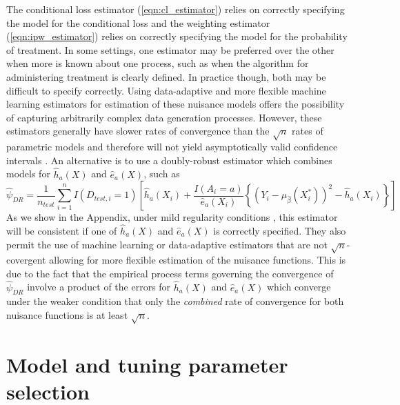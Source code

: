 The conditional loss estimator (\ref{eqn:cl_estimator}) relies on correctly specifying the model for the conditional loss and the weighting estimator (\ref{eqn:ipw_estimator})  relies on correctly specifying the model for the probability of treatment. In some settings, one estimator may be preferred over the other when more is known about one process, such as when the algorithm for administering treatment is clearly defined. In practice though, both may be difficult to specify correctly. Using data-adaptive and more flexible machine learning estimators for estimation of these nuisance models offers the possibility of capturing arbitrarily complex data generation processes. However, these estimators generally have slower rates of convergence than the $\sqrt{n}$ rates of parametric models and therefore will not yield asymptotically valid confidence intervals \cite{chernozhukov_doubledebiased_2018}. An alternative is to use a doubly-robust estimator which combines models for $\widehat{h}_a(X)$ and $\widehat{e}_a(X)$, such as
\begin{equation}
    \widehat{\psi}_{DR} = \frac{1}{n_{test}} \sum_{i=1}^n I(D_{test,i} = 1) \left[ \widehat{h}_a(X_i) + \frac{I(A_i = a)}{\widehat{e}_a(X_i)} \left\{ (Y_i - \mu_{\widehat{\beta}}(X^*_i))^2 - \widehat{h}_a(X_i)\right\}\right]
\end{equation}
As we show in the Appendix, under mild regularity conditions \cite{robins_higher_2008}, this estimator will be consistent if one of $\widehat{h}_a(X)$ and $\widehat{e}_a(X)$ is correctly specified. They also permit the use of machine learning or data-adaptive estimators that are not $\sqrt{n}$-covergent allowing for more flexible estimation of the nuisance functions. This is due to the fact that the empirical process terms governing the convergence of $\widehat{\psi}_{DR}$ involve a product of the errors for $\widehat{h}_a(X)$ and $\widehat{e}_a(X)$ which converge under the weaker condition that only the \textit{combined} rate of convergence for both nuisance functions is at least $\sqrt{n}$.

\section{Model and tuning parameter selection} \label{sec:selection}

